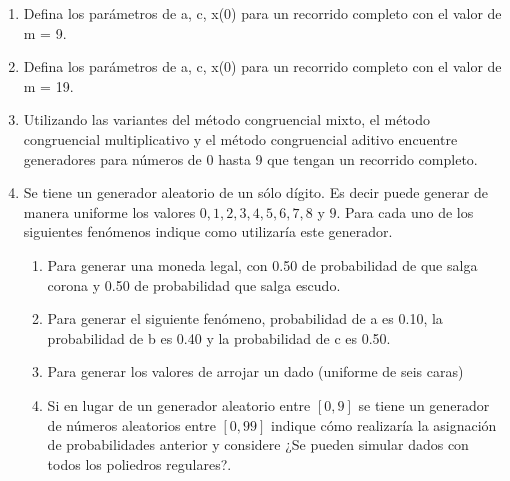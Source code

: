 \begin{enumerate}
    \item Defina los parámetros de a, c, x(0) para un recorrido completo con el valor de m = 9.
    \item Defina los parámetros de a, c, x(0) para un recorrido completo con el valor de m = 19.
    \item Utilizando las variantes del método congruencial mixto, el método congruencial multiplicativo y el método congruencial aditivo encuentre generadores para números de 0 hasta 9 que tengan un recorrido completo.
    \item Se tiene un generador aleatorio de un sólo dígito. Es decir puede generar de manera uniforme los valores $0,1,2,3,4,5,6,7,8$ y $9$. Para cada uno de los siguientes fenómenos indique como utilizaría este generador.
    \begin{enumerate}[label=\alph*.]
    \item Para generar una moneda legal, con 0.50 de probabilidad de que salga corona y 0.50 de probabilidad que salga escudo.
    \item Para generar el siguiente fenómeno, probabilidad de a es 0.10, la probabilidad de b es 0.40 y la probabilidad de c es 0.50.
    \item Para generar los valores de arrojar un dado (uniforme de seis caras)
    \item Si en lugar de un generador aleatorio entre $[0,9]$ se tiene un generador de números aleatorios entre $[0,99]$ indique cómo realizaría la asignación de probabilidades anterior y considere ¿Se pueden simular dados con todos los poliedros regulares?.
    \end{enumerate}
\end{enumerate}






